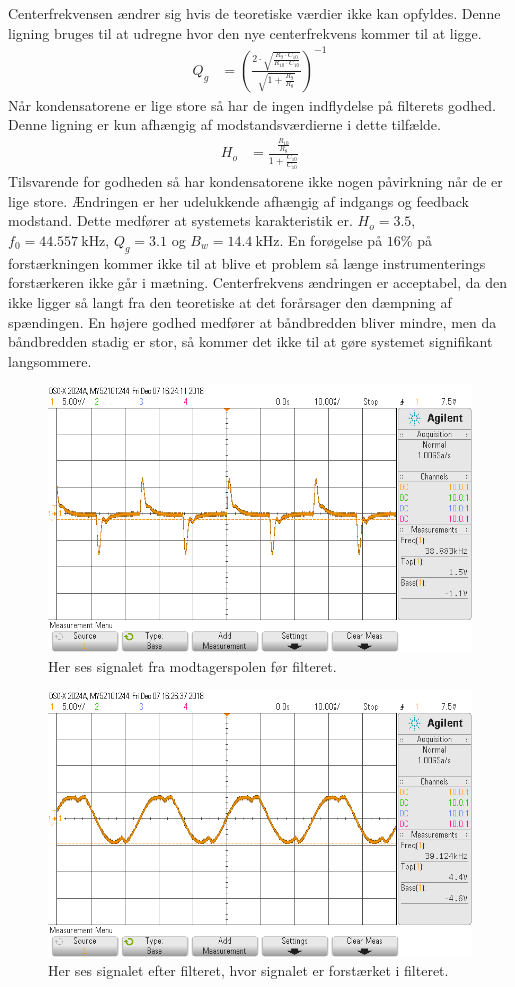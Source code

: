 Centerfrekvensen ændrer sig hvis de teoretiske værdier ikke kan opfyldes. Denne ligning bruges til at udregne hvor den nye centerfrekvens kommer til at ligge.
\begin{align}
	Q_g & = \left( \frac{2 \cdot \sqrt{\frac{R_9 \cdot C_{10}}{R_{10} \cdot C_{10}}}}{\sqrt{1+\frac{R_9}{R_8}}} \right)^{-1}
	\end{align}
Når kondensatorene er lige store så har de ingen indflydelse på filterets godhed. Denne ligning er kun afhængig af modstandsværdierne i dette tilfælde.
\begin{align}
	H_o & = \frac{\frac{R_{10}}{R_8}}{1+\frac{C_{10}}{C_{10}}}
\end{align}
Tilsvarende for godheden så har kondensatorene ikke nogen påvirkning når de er lige store.
Ændringen er her udelukkende afhængig af indgangs og feedback modstand.
Dette medfører at systemets karakteristik er. 
$H_o = \num{3.5}$, $f_0 = \SI{44.557}{\kilo\hertz}$, $Q_g = \num{3.1}$ og $B_w = \SI{14.4}{\kilo\hertz}$. 
En forøgelse på $16 \%$ på forstærkningen kommer ikke til at blive et problem så længe instrumenterings forstærkeren ikke går i mætning. 
Centerfrekvens ændringen er acceptabel, da den ikke ligger så langt fra den teoretiske at det forårsager den dæmpning af spændingen.
En højere godhed medfører at båndbredden bliver mindre, men da båndbredden stadig er stor, så kommer det ikke til at gøre systemet signifikant langsommere.
\begin{figure}[h!]
	\centering
	\includegraphics[width=1\textwidth]{billeder/filter_in_png.png}
	\caption{Her ses signalet fra modtagerspolen før filteret.}
	\label{fig:filter_in}
\end{figure}
\begin{figure}[h!]
	\centering
	\includegraphics[width=1\textwidth]{billeder/filter_out_png.png}
	\caption{Her ses signalet efter filteret, hvor signalet er forstærket i filteret.}
	\label{fig:filter_out}
\end{figure}